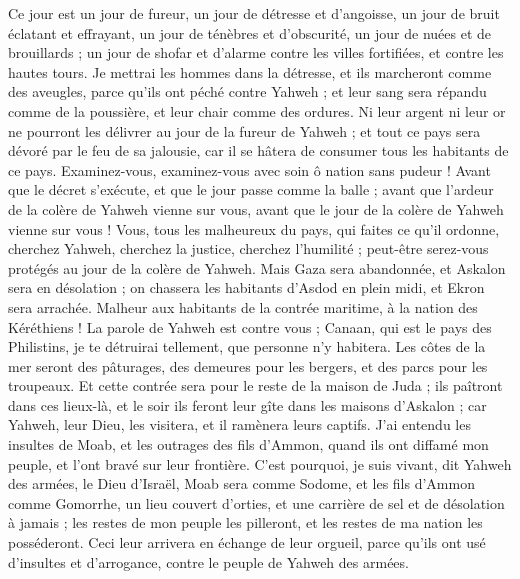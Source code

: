 \begin{multicols}{2}
Ce jour est un jour de fureur, un jour de détresse et d'angoisse, un jour de bruit éclatant et effrayant, un jour de ténèbres et d'obscurité, un jour de nuées et de brouillards ;
un jour de shofar et d'alarme contre les villes fortifiées, et contre les hautes tours.
Je mettrai les hommes dans la détresse, et ils marcheront comme des aveugles, parce qu'ils ont péché contre Yahweh ; et leur sang sera répandu comme de la poussière, et leur chair comme des ordures.
Ni leur argent ni leur or ne pourront les délivrer au jour de la fureur de Yahweh ; et tout ce pays sera dévoré par le feu de sa jalousie, car il se hâtera de consumer tous les habitants de ce pays.
\VerseOne{}Examinez-vous, examinez-vous avec soin ô nation sans pudeur !
Avant que le décret s’exécute, et que le jour passe comme la balle ; avant que l'ardeur de la colère de Yahweh vienne sur vous, avant que le jour de la colère de Yahweh vienne sur vous !
Vous, tous les malheureux du pays, qui faites ce qu'il ordonne, cherchez Yahweh, cherchez la justice, cherchez l’humilité ; peut-être serez-vous protégés au jour de la colère de Yahweh.
Mais Gaza sera abandonnée, et Askalon sera en désolation ; on chassera les habitants d'Asdod en plein midi, et Ekron sera arrachée.
Malheur aux habitants de la contrée maritime, à la nation des Kéréthiens ! La parole de Yahweh est contre vous ; Canaan, qui est le pays des Philistins, je te détruirai tellement, que personne n'y habitera.
Les côtes de la mer seront des pâturages, des demeures pour les bergers, et des parcs pour les troupeaux.
Et cette contrée sera pour le reste de la maison de Juda ; ils paîtront dans ces lieux-là, et le soir ils feront leur gîte dans les maisons d'Askalon ; car Yahweh, leur Dieu, les visitera, et il ramènera leurs captifs.
J'ai entendu les insultes de Moab, et les outrages  des fils d’Ammon, quand ils ont diffamé mon peuple, et l'ont bravé sur leur frontière.
C'est pourquoi, je suis vivant, dit Yahweh des armées, le Dieu d'Israël, Moab sera comme Sodome, et les fils d’Ammon  comme Gomorrhe, un lieu couvert d'orties, et une carrière de sel et de désolation à jamais ; les restes de mon peuple les pilleront, et les restes de ma nation les posséderont.
Ceci leur arrivera en échange de leur orgueil, parce qu'ils ont usé d'insultes et d’arrogance, contre le peuple de Yahweh des armées.

\end{multicols}
